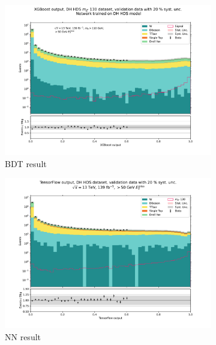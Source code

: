 \documentclass[12pt, a4paper]{book}
\begin{document}
\begin{figure}[!ht]
	\centering
   \graphicspath{{../../../Plots/XGBoost/Weighting_methods/}}
   \begin{subfigure}[b]{0.49\textwidth}
      \centering
      \includegraphics[width=1\textwidth]{Pos_wgt/VAL.pdf}
      \caption{BDT result}
   \end{subfigure}
   \graphicspath{{../../../Plots/NeuralNetwork/Padding/}}
   \begin{subfigure}[b]{0.49\textwidth}
      \centering
      \includegraphics[width=1\textwidth]{New_pad/VAL.pdf}
      \caption{NN result}
   \end{subfigure}
   \graphicspath{{../../../Plots/XGBoost/Weighting_methods/}}
   \begin{subfigure}[b]{0.49\textwidth}

\end{subfigure}
\end{figure}
\end{document}
